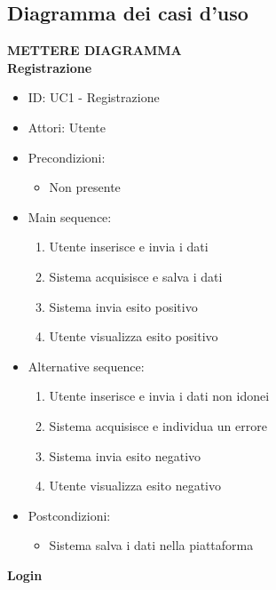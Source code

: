 \documentclass{article}
\begin{document}
\subsection{Diagramma dei casi d'uso}
\large
\textbf{METTERE DIAGRAMMA}\vspace*{7pt}\\

\newpage
\textbf{Registrazione}
\begin{itemize}[label = { }]
    \itemsep0px
    \item ID: UC1 - Registrazione
    \item Attori: Utente
    \item Precondizioni: 
        \begin{itemize}[label = {-}]
            \item Non presente
        \end{itemize}
    \item Main sequence: 
        \begin{enumerate}
            \item Utente inserisce e invia i dati
            \item Sistema acquisisce e salva i dati
            \item Sistema invia esito positivo
            \item Utente visualizza esito positivo
        \end{enumerate}
    \item Alternative sequence:
        \begin{enumerate}
            \item Utente inserisce e invia i dati non idonei
            \item Sistema acquisisce e individua un errore
            \item Sistema invia esito negativo
            \item Utente visualizza esito negativo
        \end{enumerate}
    \item Postcondizioni: 
        \begin{itemize}[label = {-}]
            \item Sistema salva i dati nella piattaforma
        \end{itemize}
\end{itemize}
\textbf{Login}
\end{document}
